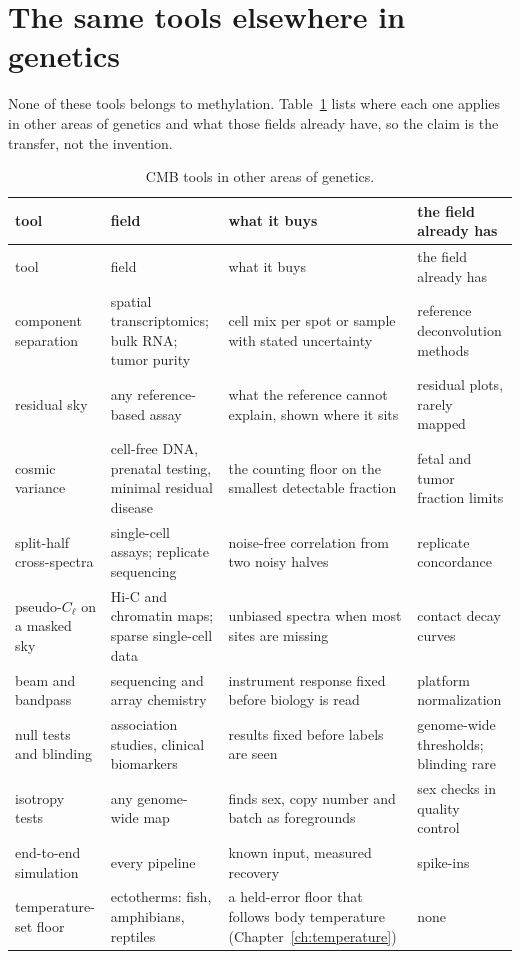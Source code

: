 \section{The same tools elsewhere in genetics}

None of these tools belongs to methylation. Table~\ref{tab:elsewhere} lists where each one applies in other areas of genetics and what those
fields already have, so the claim is the transfer, not the invention.

\begin{center}\small
\begin{longtable}{@{}p{}p{}p{}p{}@{}}
\caption{CMB tools in other areas of genetics.}\label{tab:elsewhere}\\
\toprule tool & field & what it buys & the field already has \\\midrule\endfirsthead
\toprule tool & field & what it buys & the field already has \\\midrule\endhead
component separation & spatial transcriptomics; bulk RNA; tumor purity & cell mix per spot or sample with stated uncertainty & reference
deconvolution methods \\
residual sky & any reference-based assay & what the reference cannot explain, shown where it sits & residual plots, rarely mapped \\
cosmic variance & cell-free DNA, prenatal testing, minimal residual disease & the counting floor on the smallest detectable fraction & fetal
and tumor fraction limits \\
split-half cross-spectra & single-cell assays; replicate sequencing & noise-free correlation from two noisy halves & replicate concordance \\
pseudo-$C_\ell$ on a masked sky & Hi-C and chromatin maps; sparse single-cell data & unbiased spectra when most sites are missing & contact
decay curves \\
beam and bandpass & sequencing and array chemistry & instrument response fixed before biology is read & platform normalization \\
null tests and blinding & association studies, clinical biomarkers & results fixed before labels are seen & genome-wide thresholds; blinding
rare \\
isotropy tests & any genome-wide map & finds sex, copy number and batch as foregrounds & sex checks in quality control \\
end-to-end simulation & every pipeline & known input, measured recovery & spike-ins \\
temperature-set floor & ectotherms: fish, amphibians, reptiles & a held-error floor that follows body temperature (Chapter~\ref{ch:temperature})
& none \\\bottomrule
\end{longtable}
\end{center}

